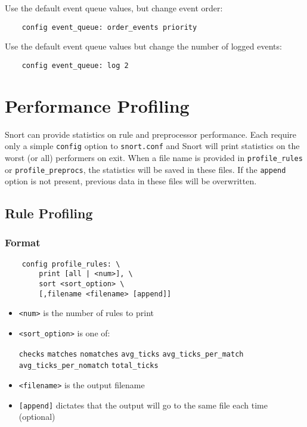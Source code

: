 \documentclass[english]{report}
\begin{document}
Use the default event queue values, but change event order:

\begin{verbatim}
    config event_queue: order_events priority
\end{verbatim}

Use the default event queue values but change the number of logged events:

\begin{verbatim}
    config event_queue: log 2
\end{verbatim}

\section{Performance Profiling}

Snort can provide statistics on rule and preprocessor performance.  Each
require only a simple \texttt{config} option to \texttt{snort.conf} and Snort
will print statistics on the worst (or all) performers on exit. When a file
name is provided in \texttt{profile\_rules} or \texttt{profile\_preprocs}, the
statistics will be saved in these files. If the \texttt{append} option is not
present, previous data in these files will be overwritten.

\subsection{Rule Profiling}
\label{rule profiling}

\subsubsection{Format}

\begin{verbatim}
    config profile_rules: \
        print [all | <num>], \
        sort <sort_option> \
        [,filename <filename> [append]]
\end{verbatim}

\begin{itemize}
\item \texttt{<num>} is the number of rules to print
\item \texttt{<sort\_option>} is one of:

    \subitem \texttt{checks}
    \subitem \texttt{matches}
    \subitem \texttt{nomatches}
    \subitem \texttt{avg\_ticks}
    \subitem \texttt{avg\_ticks\_per\_match}
    \subitem \texttt{avg\_ticks\_per\_nomatch}
    \subitem \texttt{total\_ticks}

\item \texttt{<filename>} is the output filename

\item \texttt{[append]} dictates that the output will go to the same file each
time (optional)

\end{itemize}
\end{document}
